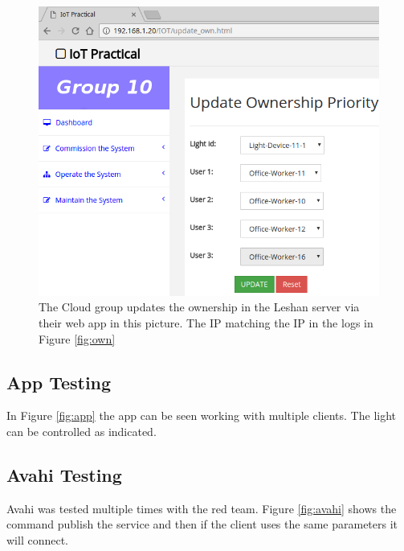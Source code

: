\begin{figure}[h]
	\begin{center}
		\includegraphics[width=.8\linewidth]{img/screenshot-cloud-ownership}
		\caption{The Cloud group updates the ownership in the Leshan server via their web app in this picture. The IP matching the IP in the logs in Figure \ref{fig:own}}
		\label{fig:cloudown}
	\end{center}
\end{figure}

\subsection{App Testing}
In Figure \ref{fig:app} the app can be seen working with multiple clients. The light can be controlled as indicated.

\subsection{Avahi Testing}

Avahi was tested multiple times with the red team. Figure \ref{fig:avahi} shows the command publish the service and then if the client uses the same parameters it will connect. 